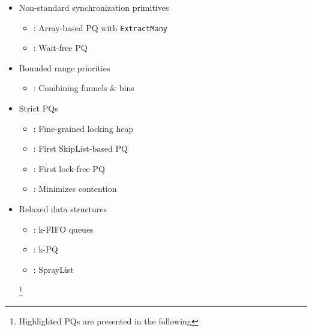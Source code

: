 \documentclass[usenames,dvipsnames]{beamer}
\begin{document}
\begin{frame}{}
\begin{itemize}
\item Non-standard synchronization primitives
    \begin{itemize}
    \item \citeauthor{liu2012lock}: Array-based \ac{PQ} with \lstinline|ExtractMany|
    \item \citeauthor{israeli1993efficient}: Wait-free \ac{PQ}
    \end{itemize}

\item Bounded range priorities
    \begin{itemize}
    \item \citeauthor{shavit1999scalable}: Combining funnels \& bins
    \end{itemize}

\item Strict \acp{PQ}
    \begin{itemize}
    \item \citeauthor{hunt1996efficient}: \textcolor{BrickRed}{Fine-grained locking heap}
    \item \citeauthor{shavit2000skiplist}: \textcolor{BrickRed}{First SkipList-based \ac{PQ}}
    \item \citeauthor{sundell2003fast}: \textcolor{BrickRed}{First lock-free \ac{PQ}}
    \item \citeauthor{linden2013skiplist}: \textcolor{BrickRed}{Minimizes contention}
    \end{itemize}

\item Relaxed data structures
    \begin{itemize}
    \item \citeauthor{kirsch2012fast}: k-FIFO queues
    \item \citeauthor{wimmer2013data}: \textcolor{BrickRed}{k-\ac{PQ}}
    \item \citeauthor{alistarhspraylist}: \textcolor{BrickRed}{SprayList}
    \end{itemize}

\let\thefootnote\relax\footnote{Highlighted \acp{PQ} are presented in the following}

\end{itemize}
\end{frame}

\end{document}
